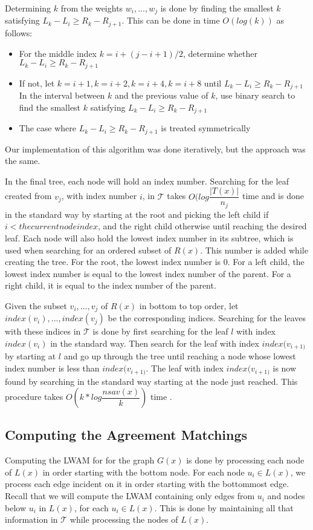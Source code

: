 Determining $k$ from the weights ${w_i, ..., w_j}$ is done by finding the smallest $k$ satisfying $L_k-L_i \ge R_k-R_{j+1}$. This can be done in time $O(log(k))$ as follows:

\begin{itemize}
	\item For the middle index $k=i+(j-i+1)/2$, determine whether $L_k-L_i \ge R_k-R_{j+1}$
	\item If not, let $k=i+1, k=i+2, k=i+4, k=i+8$ until $L_k-L_i \ge R_k-R_{j+1}$
	\subitem In the interval between $k$ and the previous value of $k$, use binary search to find the smallest $k$ satisfying $L_k-L_i \ge R_k-R_{j+1}$
	\item The case where $L_k-L_i \ge R_k-R_{j+1}$ is treated symmetrically
\end{itemize}

Our implementation of this algorithm was done iteratively, but the approach was the same.

In the final tree, each node will hold an index number. Searching for the leaf created from $v_j$, with index number $i$, in $\mathcal{T}$ takes $O(log \dfrac{|T(x)|}{n_j}$ time  and is done in the standard way by starting at the root and picking the left child if $i < the current node index$, and the right child otherwise until reaching the desired leaf. Each node will also hold the lowest index number in its subtree, which is used when searching for an ordered subset of $R(x)$. This number is added while creating the tree. For the root, the lowest index number is 0. For a left child, the lowest index number is equal to the lowest index number of the parent. For a right child, it is equal to the index number of the parent.

Given the subset ${v_i, ..., v_j}$ of $R(x)$ in bottom to top order, let ${index(v_i), ..., index(v_j)}$ be the corresponding indices. Searching for the leaves with these indices in $\mathcal{T}$ is done by first searching for the leaf $l$ with index $index(v_i)$ in the standard way. Then search for the leaf with index $index(v_{i+1)}$ by starting at $l$ and go up through the tree until reaching a node whose lowest index number is less than $index(v_{i+1)}$. The leaf with index $index(v_{i+1)}$ is now found by searching in the standard way starting at the node just reached. This procedure takes $O(k*log \dfrac{nsav(x)}{k})$ time .

\subsection{Computing the Agreement Matchings}
Computing the LWAM for for the graph $G(x)$ is done by processing each node of $L(x)$ in order starting with the bottom node. For each node $u_i \in L(x)$, we process each edge incident on it in order starting with the bottommost edge. Recall that we will compute the LWAM containing only edges from $u_i$ and nodes below $u_i$ in $L(x)$, for each $u_i \in L(x)$. This is done by maintaining all that information in $\mathcal{T}$ while processing the nodes of $L(x)$.

